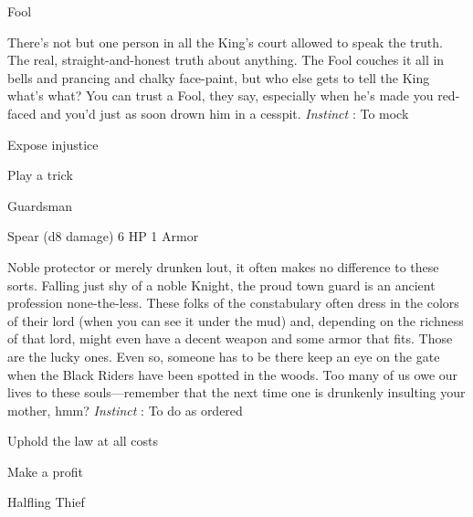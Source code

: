        
\stopitemize
       
\startMonsterName
Fool	
\stopMonsterName
       
\startMonsterDescription
There’s not but one person in all the King’s court allowed to speak the truth. The real, straight-and-honest truth about anything. The Fool couches it all in bells and prancing and chalky face-paint, but who else gets to tell the King what’s what? You can trust a Fool, they say, especially when he’s made you red-faced and you’d just as soon drown him in a cesspit. {\em Instinct} : To mock
\stopMonsterDescription
       
\startitemize[1,packed]
         
\item Expose injustice

         
\item Play a trick

       
\stopitemize
       
\startMonsterName
Guardsman	 
\stopMonsterName
       

Spear (d8 damage)	6 HP	1 Armor

       


       
\startMonsterDescription
Noble protector or merely drunken lout, it often makes no difference to these sorts. Falling just shy of a noble Knight, the proud town guard is an ancient profession none-the-less. These folks of the constabulary often dress in the colors of their lord (when you can see it under the mud) and, depending on the richness of that lord, might even have a decent weapon and some armor that fits. Those are the lucky ones. Even so, someone has to be there keep an eye on the gate when the Black Riders have been spotted in the woods. Too many of us owe our lives to these souls—remember that the next time one is drunkenly insulting your mother, hmm? {\em Instinct} : To do as ordered
\stopMonsterDescription
       
\startitemize[1,packed]
         
\item Uphold the law at all costs

         
\item Make a profit

       
\stopitemize
       
\startMonsterName
Halfling Thief	 
\stopMonsterName
       

